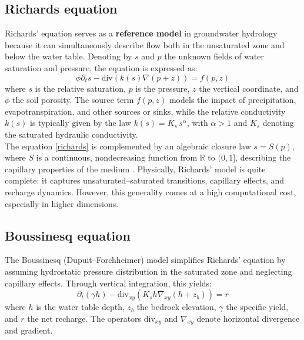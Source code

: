 \documentclass[12pt,a4paper]{article}
\begin{document}
\subsection{Richards equation}  
Richards' equation serves as a \textbf{reference model} in groundwater hydrology because it can simultaneously describe flow both in the unsaturated zone and below the water table. Denoting by \( s \) and \( p \) the unknown fields of water saturation and pressure, the equation is expressed as:
\begin{equation}\label{richards}
\phi \partial_t s - \mathrm{div} \left( k(s) \nabla ( p + z ) \right) = f(p,z)
\end{equation}
where $s$ is the relative saturation, $p$ is the pressure, $z$ the vertical coordinate, and $\phi$ the soil porosity.  
The source term \( f(p,z) \) models the impact of precipitation, evapotranspiration, and other sources or sinks, while the relative conductivity \( k(s) \) is typically given by the law \( k(s) = K_s\,s^\alpha \), with \( \alpha > 1 \) and $K_s$ denoting the saturated hydraulic conductivity.  \\

The equation \eqref{richards} is complemented by an algebraic closure law \( s = S(p) \), where \( S \) is a continuous, nondecreasing function from \( \mathbb{R} \) to \( (0,1] \), describing the capillary properties of the medium \cite{van1980closed}.  
Physically, Richards' model is quite complete: it captures unsaturated–saturated transitions, capillary effects, and recharge dynamics. However, this generality comes at a high computational cost, especially in higher dimensions.

\subsection{Boussinesq equation}  
The Boussinesq (Dupuit–Forchheimer) model \cite{Dupuit,Forchheimer} simplifies Richards' equation by assuming hydrostatic pressure distribution in the saturated zone and neglecting capillary effects. Through vertical integration, this yields:
\begin{equation}\label{dupuit}
\partial_t (\gamma h) - \mathrm{div}_{xy} \left( K_s h \nabla_{xy}(h + z_b) \right) = r
\end{equation}
where \( h \) is the water table depth, \( z_b \) the bedrock elevation, \( \gamma \) the specific yield, and \( r \) the net recharge. The operators \( \mathrm{div}_{xy} \) and \( \nabla_{xy} \) denote horizontal divergence and gradient.  \\
\end{document}
